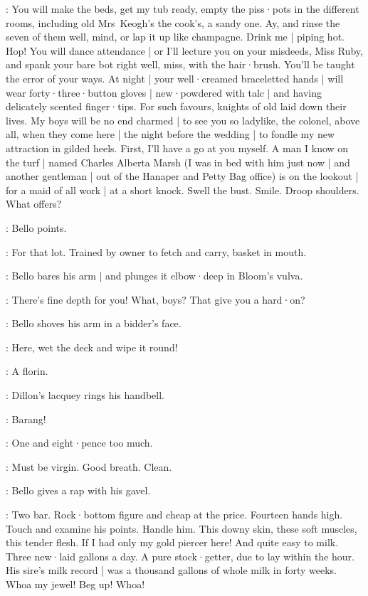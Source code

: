 \Bello:
You will make the beds,
get my tub ready,
empty the piss·pots in the different rooms,
including old Mrs~Keogh's the cook's,
a sandy one.
Ay,
and rinse the seven of them well,
mind,
or lap it up like champagne.
Drink me |
piping hot.
Hop!
You will dance attendance |
or I'll lecture you on your misdeeds,
Miss Ruby,
and spank your bare bot right well,
miss,
with the hair·brush.
You'll be taught the error of your ways.
At night |
your well·creamed braceletted hands |
will wear forty·three·button gloves |
new·powdered with talc |
and having delicately scented finger·tips.
%
For such favours,
knights of old laid down their lives.
My boys will be no end charmed |
to see you so ladylike,
the colonel,
above all,
when they come here |
the night before the wedding |
to fondle my new attraction in gilded heels.
First,
I'll have a go at you myself.
A man I know on the turf |
named Charles Alberta Marsh
(I was in bed with him just now |
and another gentleman |
out of the Hanaper and Petty Bag office)
is on the lookout |
for a maid of all work |
at a short knock.
Swell the bust.
Smile.
Droop shoulders.
What offers?

:
Bello points.

\Bello:
For that lot.
Trained by owner to fetch and carry,
basket in mouth.

:
Bello bares his arm |
and plunges it elbow·deep in Bloom's vulva.

\Bello:
There's fine depth for you!
What,
boys?
That give you a hard·on?

:
Bello shoves his arm in a bidder's face.

\Bello:
Here,
wet the deck and wipe it round!

\Bidder:
A florin.

:
Dillon's lacquey rings his handbell.

\Lacquey:
Barang!

\Voice:
One and eight·pence too much.

\Marsh[2b]:
Must be virgin.
Good breath.
Clean.

:
Bello gives a rap with his gavel.

\Bello:
Two bar.
Rock·bottom figure and cheap at the price.
Fourteen hands high.
Touch and examine his points.
Handle him.
This downy skin,
these soft muscles,
this tender flesh.
If I had only my gold piercer here!
And quite easy to milk.
Three new·laid gallons a day.
A pure stock·getter,
due to lay within the hour.
His sire's milk record |
was a thousand gallons of whole milk in forty weeks.
Whoa my jewel!
Beg up!
Whoa!

